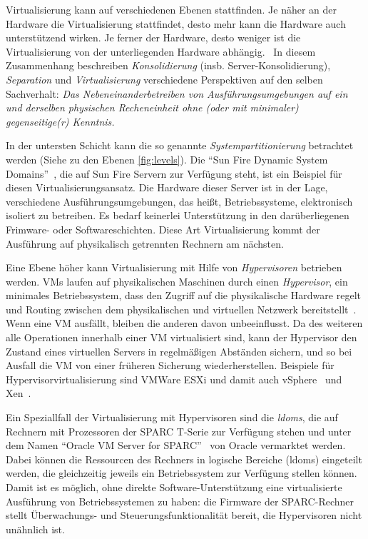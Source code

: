Virtualisierung kann auf verschiedenen Ebenen stattfinden. Je näher an
der Hardware die Virtualisierung stattfindet, desto mehr kann die
Hardware auch unterstützend wirken. Je ferner der Hardware, desto
weniger ist die Virtualisierung von der unterliegenden Hardware
abhängig.~\cite{Giesekus2010:Virtualisierung} In diesem Zusammenhang
beschreiben \emph{Konsolidierung} (insb. Server-Konsolidierung),
\emph{Separation} und \emph{Virtualisierung} verschiedene Perspektiven
auf den selben Sachverhalt: \emph{Das Nebeneinanderbetreiben von
Ausführungsumgebungen auf ein und derselben physischen Recheneinheit
ohne (oder mit minimaler) gegenseitige(r) Kenntnis.}

In der untersten Schicht kann die so genannte
\emph{Systempartitionierung} betrachtet werden (Siehe zu den Ebenen
\autoref{fig:levels}). Die "`Sun Fire Dynamic System
Domains"'~\cite{Shoumack2007:Beginners-Guid-}, die auf Sun Fire
Servern zur Verfügung steht, ist ein Beispiel für diesen
Virtualisierungsansatz. Die Hardware dieser Server ist in der Lage,
verschiedene Ausführungsumgebungen, das heißt, Betriebssysteme,
elektronisch isoliert zu betreiben. Es bedarf keinerlei Unterstützung
in den darüberliegenen Frimware- oder Softwareschichten. Diese Art
Virtualisierung kommt der Ausführung auf physikalisch getrennten
Rechnern am nächsten.

Eine Ebene höher kann Virtualisierung mit Hilfe von
\emph{Hypervisoren} betrieben werden. \acfp{VM} laufen auf
physikalischen Maschinen durch einen \emph{Hypervisor}, ein minimales
Betriebssystem, dass den Zugriff auf die physikalische Hardware regelt
und Routing zwischen dem physikalischen und virtuellen Netzwerk
bereitstellt~\cite{tanenbaum1992modern}. Wenn eine \ac{VM} ausfällt,
bleiben die anderen davon unbeeinflusst. Da des weiteren alle
Operationen innerhalb einer \ac{VM} virtualisiert sind, kann der Hypervisor
den Zustand eines virtuellen Servers in regelmäßigen Abständen
sichern, und so bei Ausfall die \ac{VM} von einer früheren Sicherung
wiederherstellen. Beispiele für Hypervisorvirtualisierung sind VMWare
ESXi und damit auch vSphere~\cite{:Free-VMware-vSp} und Xen~\cite{Barham:2003:XAV:945445.945462}.

Ein Speziallfall der Virtualisierung mit Hypervisoren sind die
\emph{\acfp{ldom}}, die auf Rechnern mit Prozessoren der SPARC T-Serie
zur Verfügung stehen und unter dem Namen "`Oracle VM Server for
SPARC"'~\cite{Corporation:Oracle-VM-Serve} von Oracle vermarktet
werden. Dabei können die Ressourcen des Rechners in logische Bereiche
(\aclp{ldom}) eingeteilt werden, die gleichzeitig jeweils ein
Betriebssystem zur Verfügung stellen können. Damit ist es möglich,
ohne direkte Software-Unterstützung eine virtualisierte Ausführung
von Betriebssystemen zu haben: die Firmware der SPARC-Rechner stellt
Überwachungs- und Steuerungsfunktionalität bereit, die Hypervisoren
nicht unähnlich ist.

